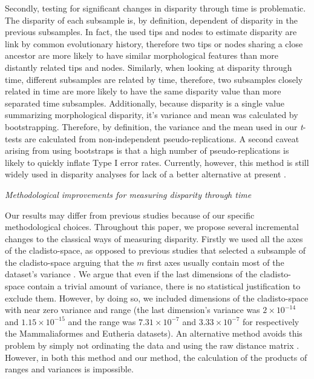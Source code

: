 \documentclass[12pt,letterpaper]{article}
\renewcommand{\subsection}[1]{%
\bigskip
\begin{center}
\begin{large}
\normalfont\itshape #1
\end{large}
\end{center}}
\begin{document}
Secondly, testing for significant changes in disparity through time is problematic.
The disparity of each subsample is, by definition, dependent of disparity in the previous subsamples.
In fact, the used tips and nodes to estimate disparity are link by common evolutionary history, therefore two tips or nodes sharing a close ancestor are more likely to have similar morphological features than more distantly related tips and nodes.
Similarly, when looking at disparity through time, different subsamples are related by time, therefore, two subsamples closely related in time are more likely to have the same disparity value than more separated time subsamples.
Additionally, because disparity is a single value summarizing morphological disparity, it's variance and mean was calculated by bootstrapping.
Therefore, by definition, the variance and the mean used in our \textit{t}-tests are calculated from non-independent pseudo-replications.
A second caveat arising from using bootstraps is that a high number of pseudo-replications is likely to quickly inflate Type I error rates. 
Currently, however, this method is still widely used in disparity analyses for lack of a better alternative at present \citep[e.g.][]{anderson2012using,zelditch2012geometric,smith2014joined}.

\subsection{Methodological improvements for measuring disparity through time}
Our results may differ from previous studies because of our specific methodological choices.
Throughout this paper, we propose several incremental changes to the classical ways of measuring disparity.
Firstly we used all the axes of the cladisto-space, as opposed to previous studies that selected a subsample of the cladisto-space arguing that the $m$ first axes usually contain most of the dataset's variance \citep[e.g][]{brusatte50,cisneros2010,prentice2011,anderson2012using,Hughes20082013,bentonmodels2014}.
We argue that even if the last dimensions of the cladisto-space contain a trivial amount of variance, there is no statistical justification to exclude them.
However, by doing so, we included dimensions of the cladisto-space with near zero variance and range (the last dimension's variance was $2\times10^{-14}$ and $1.15\times10^{-15}$ and the range was $7.31\times10^{-7}$ and $3.33\times10^{-7}$ for respectively the Mammaliaformes and Eutheria datasets).
An alternative method avoids this problem by simply not ordinating the data and using the raw distance matrix \citep[e.g.][]{bensonfaunal2014,Close2015}. 
However, in both this method and our method, the calculation of the products of ranges and variances is impossible.
\end{document}

